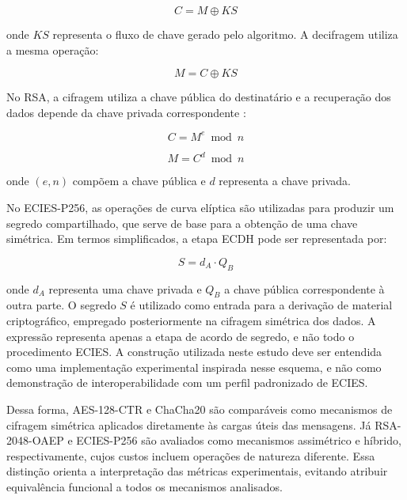 \begin{equation}
C = M \oplus KS
\end{equation}

onde $KS$ representa o fluxo de chave gerado pelo algoritmo. A decifragem utiliza a mesma operação:

\begin{equation}
M = C \oplus KS
\end{equation}

No RSA, a cifragem utiliza a chave pública do destinatário e a recuperação dos dados depende da chave privada correspondente \cite{rivest1978method,boneh1999twenty}:

\begin{equation}
C = M^e \bmod n
\end{equation}

\begin{equation}
M = C^d \bmod n
\end{equation}

onde $(e,n)$ compõem a chave pública e $d$ representa a chave privada.

No ECIES-P256, as operações de curva elíptica são utilizadas para produzir um segredo compartilhado, que serve de base para a obtenção de uma chave simétrica. Em termos simplificados, a etapa ECDH pode ser representada por:

\begin{equation}
S = d_A \cdot Q_B
\end{equation}

onde $d_A$ representa uma chave privada e $Q_B$ a chave pública correspondente à outra parte. O segredo $S$ é utilizado como entrada para a derivação de material criptográfico, empregado posteriormente na cifragem simétrica dos dados. A expressão representa apenas a etapa de acordo de segredo, e não todo o procedimento ECIES. A construção utilizada neste estudo deve ser entendida como uma implementação experimental inspirada nesse esquema, e não como demonstração de interoperabilidade com um perfil padronizado de ECIES.

Dessa forma, AES-128-CTR e ChaCha20 são comparáveis como mecanismos de cifragem simétrica aplicados diretamente às cargas úteis das mensagens. Já RSA-2048-OAEP e ECIES-P256 são avaliados como mecanismos assimétrico e híbrido, respectivamente, cujos custos incluem operações de natureza diferente. Essa distinção orienta a interpretação das métricas experimentais, evitando atribuir equivalência funcional a todos os mecanismos analisados.


